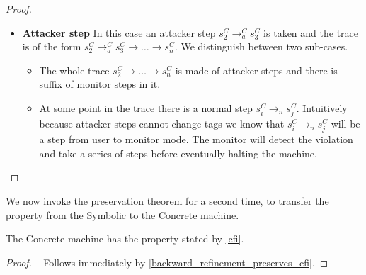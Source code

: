 \begin{proof}
\begin{itemize}
  \item \textbf{Attacker step} In this case an attacker step $s^C_2
    \to_a^{C} s^C_3$ is taken and the trace is of the form $s^C_2
    \to_a^{C} s^C_3 \to \ldots \to s^C_n$. We distinguish between
    two sub-cases.
    \begin{itemize} 
    \item The whole trace $s^C_2 \to \ldots \to s^C_n$
      is made of attacker steps and there is suffix of monitor
      steps in it.
    \item At some point in the trace there is a normal step $s^C_i
      \to_n s^C_j$. Intuitively because attacker steps cannot change
      tags we know that $s^C_i \to_n s^C_j$ will be a step from user
      to monitor mode. The monitor will detect the violation and take
      a series of steps before eventually halting the machine.
      \end{itemize}
    \end{itemize}
\end{proof}

We now invoke the preservation theorem for a second time, to transfer
the \CFI property from the Symbolic to the Concrete machine.

\begin{theorem}\label{CFIconcrete}
The Concrete machine has the \CFI property stated by \cref{cfi}.
\end{theorem}
\begin{proof}
  ~ Follows immediately by \cref{backward_refinement_preserves_cfi}.
\end{proof}